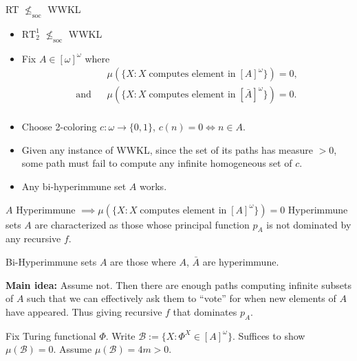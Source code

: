 \begin{frame}{RT $\nleq_{\text{soc}}$ WWKL}
  \begin{itemize}
    \item $\text{RT}_2^1$ $\nleq_{\text{soc}}$ WWKL
    \item Fix $A\in[\omega]^\omega$ where
      \begin{align*}
        &\mu(\{X: X\; \text{computes element in}\; [A]^\omega\}) =0,\\
        \text{and}\;\;\; &\mu(\{X: X\; \text{computes element in}\;
        [\bar{A}]^\omega\}) =0.\\
      \end{align*}
    \item Choose 2-coloring $c:\omega\rightarrow\{0,1\}$, $c(n)=0
      \Leftrightarrow n\in A$.
    \item Given any instance of WWKL, since the set of its paths has
      measure $>0$, some path must fail to compute any infinite
      homogeneous set of $c$. 
    \item Any bi-hyperimmune set $A$ works.
  \end{itemize}
\end{frame}

\begin{frame}{$A$ Hyperimmune $\implies \mu(\{X: X\; \text{computes
element in}\; [A]^\omega\}) =0$}
  Hyperimmune sets $A$ are characterized as those whose principal
  function $p_A$ is not dominated by any recursive $f$. \\
  \vspace{1em}

  Bi-Hyperimmune sets $A$ are those where $A$, $\bar{A}$ are hyperimmune.\\
  \vspace{1em}

  \textbf{Main idea:} Assume not. Then there are enough paths computing
  infinite subsets of $A$ such that we can effectively ask them to ``vote''
  for when new elements of $A$ have appeared. Thus giving recursive
  $f$ that dominates $p_A$.\\
  \vspace{1em}

  Fix Turing functional $\Phi$. Write $\mathcal{B} :=\{X:
  \Phi^X\in[A]^\omega\}$. Suffices to show $\mu(\mathcal{B})=0$. Assume
  $\mu(\mathcal{B})=4m>0$.
\end{frame}

